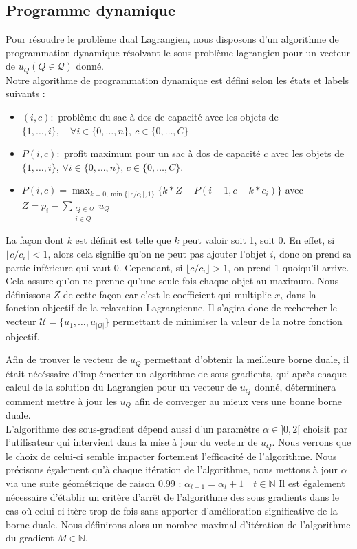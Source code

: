 \documentclass[french,nochapter,11pt]{rapportUB}
\begin{document}
	\subsection{Programme dynamique}
	Pour résoudre le problème dual Lagrangien, nous disposons d'un algorithme de programmation dynamique résolvant le sous problème lagrangien pour un vecteur de $u_Q  (Q \in \mathcal{Q})$ donné. \\
	Notre algorithme de programmation dynamique est défini selon les états et labels suivants : 
	\begin{itemize}
		\item  $(i,c) : $ problème du sac à dos de capacité avec les objets de $\{1,\dots,i\}, \quad \forall i \in \{0,\dots,n\}, ~ c\in \{0,\dots,C\}$
		\item $P(i,c) : $ profit maximum pour un sac à dos de capacité $c$ avec les objets de $\{1,\dots,i\}$, 
		$\forall i \in \{0,\dots,n\}$, $c\in \{0,\dots,C\}$. 
		\item 	$P(i,c) = \max_{k=0,\min\{\lfloor c/c_i\rfloor, 1\}}\{k*Z + P(i-1, c - k*c_i)\}$ avec $Z = p_i - \sum_{\substack{Q \in \mathcal{Q} \\ i \in Q}}u_Q$ 
	\end{itemize}
	
	La façon dont $k$ est définit est telle que $k$ peut valoir soit 1, soit 0. En effet, si $\lfloor c/c_i \rfloor < 1$, alors cela signifie qu'on ne peut pas ajouter l'objet $i$, donc on prend sa partie inférieure qui vaut 0. Cependant, si $\lfloor c/c_i \rfloor > 1$, on prend 1 quoiqu'il arrive. Cela assure qu'on ne prenne qu'une seule fois chaque objet au maximum. Nous définissons $Z$ de cette façon car c'est le coefficient qui multiplie $x_i$ dans la fonction objectif de la relaxation Lagrangienne. Il s'agira donc de rechercher le vecteur $\mathcal{U} = \{u_1, \dots, u_{|\mathcal{Q}|}\}$ permettant de minimiser la valeur de la notre fonction objectif.
	
	\vspace{0.3cm}
	 Afin de trouver le vecteur de $u_Q$ permettant d'obtenir la meilleure borne duale, il était nécéssaire d'implémenter un algorithme de sous-gradients, qui après chaque calcul de la solution du Lagrangien pour un vecteur de $u_Q$ donné, déterminera comment mettre à jour les $u_Q$ afin de converger au mieux vers une bonne borne duale.  \\
	L'algorithme des sous-gradient dépend aussi d'un paramètre $\alpha \in  ]0,2[$ choisit par l'utilisateur qui intervient dans la mise à jour du vecteur de $u_Q$. Nous verrons que le choix de celui-ci semble impacter fortement l'efficacité de l'algorithme. Nous précisons également qu'à chaque itération de l'algorithme, nous mettons à jour $\alpha$ via une suite géométrique de raison 0.99 : $\alpha_{t+1} = \alpha_{t} +1\quad t \in \mathbb{N}$
	Il est également nécessaire d'établir un critère d'arrêt de l'algorithme des sous gradients dans le cas où celui-ci itère trop de fois sans apporter d'amélioration significative de la borne duale. Nous définirons alors un nombre maximal d'itération de l'algorithme du gradient $M \in \mathbb{N}$. 
	
\end{document}
